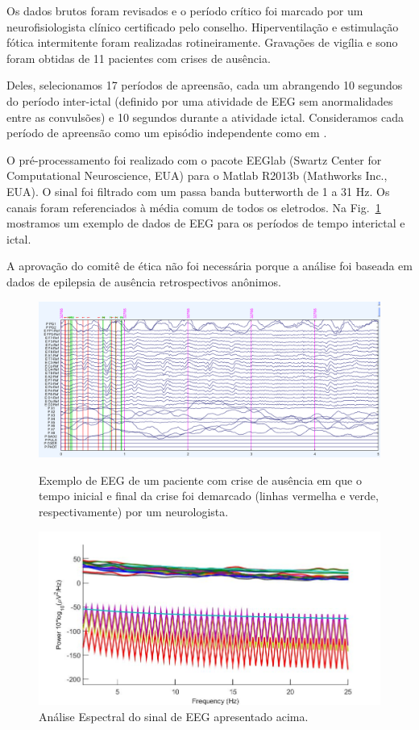 \documentclass[
	12pt,				%
	openright,			%
	twoside,			%
	a4paper,			%
	english,			%
	french,				%
	spanish,			%
	brazil				%
	]{abntex2}
\begin{document}
Os dados brutos foram revisados e o período crítico foi marcado por um neurofisiologista clínico certificado pelo conselho. Hiperventilação e estimulação fótica intermitente foram realizadas rotineiramente. Gravações de vigília e sono foram obtidas de 11 pacientes com crises de ausência. 

Deles, selecionamos 17 períodos de apreensão, cada um abrangendo 10 segundos do período inter-ictal (definido por uma atividade de EEG sem anormalidades entre as convulsões) e 10 segundos durante a atividade ictal. Consideramos cada período de apreensão como um episódio independente como em \cite {sadleir2006electroclinical, mormann2003epileptic}.

O pré-processamento foi realizado com o pacote EEGlab (Swartz Center for Computational Neuroscience, EUA) para o Matlab R2013b (Mathworks Inc., EUA). O sinal foi filtrado com um passa banda butterworth de 1 a 31 Hz. Os canais foram referenciados à média comum de todos os eletrodos. Na Fig.~\ref{fig: eeg}  mostramos um exemplo de dados de EEG para os períodos de tempo interictal e ictal.

A aprovação do comitê de ética não foi necessária porque a análise foi baseada em dados de epilepsia de ausência retrospectivos anônimos.


\begin{figure}[h]
\centering
\includegraphics[width=17cm]{figs/EEG-Joao-1.PNG}
\label{fig: eeg}
\caption{Exemplo de EEG de um paciente com crise de ausência em que o tempo inicial e final da crise foi demarcado (linhas vermelha e verde, respectivamente) por um neurologista.}
\end{figure}



\begin{figure}[h]
\centering
\includegraphics[width=17cm]{figs/Spectro_Joao_1.jpg}
\caption{Análise Espectral do sinal de EEG apresentado acima.}
\label{espectro}
\end{figure}
\end{document}
